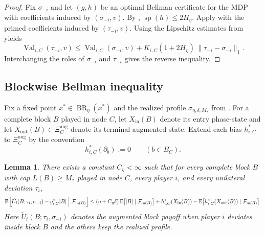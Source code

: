 \documentclass[12pt]{article}
\newtheorem{lemma}[theorem]{Lemma}
\theoremstyle{definition}
\newcommand{\E}{\mathbb{E}}
\newcommand{\1}{\mathbf{1}}
\newcommand{\cF}{\mathcal{F}}
\DeclareMathOperator{\spn}{sp}
\DeclareMathOperator{\BR}{BR}
\begin{document}
\begin{proof}
Fix $\sigma_{-i}$ and let $(g,h)$ be an optimal Bellman certificate for the MDP with
coefficients induced by $(\sigma_{-i},v)$. By ,
$\spn(h)\le 2H_\eta$. Apply  with the primed
coefficients induced by $(\tau_{-i},v)$. Using the Lipschitz estimates from
 yields
\[
\operatorname{Val}_{i,C}(\tau_{-i},v)
\le
\operatorname{Val}_{i,C}(\sigma_{-i},v)
+
K_{i,C}(1+2H_\eta)\,\|\tau_{-i}-\sigma_{-i}\|_1.
\]
Interchanging the roles of $\sigma_{-i}$ and $\tau_{-i}$ gives the reverse
inequality.
\end{proof}


\subsection{Blockwise Bellman inequality}

Fix a fixed point $x^*\in\BR_\eta(x^*)$ and the realized profile
$\sigma_{\eta,\delta,M_*}$ from . For a complete block $B$
played in node $C$, let $X_{\mathrm{in}}(B)$ denote its entry phase-state and let
$X_{\mathrm{out}}(B)\in\Xi_C^{\mathrm{aug}}$ denote its terminal augmented state.
Extend each bias $h_{i,C}^*$ to $\Xi_C^{\mathrm{aug}}$ by the convention
\[
h_{i,C}^*(\partial_b):=0
\qquad (b\in B_C).
\]

\begin{lemma}
\label{lem:block-bellman}
There exists a constant $C_\eta<\infty$ such that for every complete block $B$
with cap $L(B)\ge M_*$ played in node $C$, every player $i$, and every unilateral
deviation $\tau_i$,
\begin{equation}
\label{eq:block-bellman-ineq}
\E\left[
\widetilde U_i(B;\tau_i,\sigma_{-i}) - g_{i,C}^*|B|
\Bigm|\cF_{\mathrm{in}(B)}
\right]
\le
(\eta+C_\eta\delta)\,\E\bigl[|B|\mid \cF_{\mathrm{in}(B)}\bigr]
+
h_{i,C}^*(X_{\mathrm{in}}(B))
-
\E\bigl[h_{i,C}^*(X_{\mathrm{out}}(B))\mid\cF_{\mathrm{in}(B)}\bigr].
\end{equation}
Here $\widetilde U_i(B;\tau_i,\sigma_{-i})$ denotes the augmented block payoff when
player $i$ deviates inside block $B$ and the others keep the realized profile.
\end{lemma}
\end{document}
